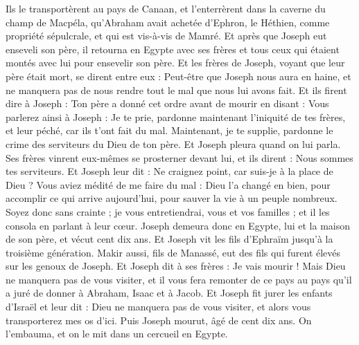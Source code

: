 \begin{multicols}{2}
Ils le transportèrent au pays de Canaan, et l'enterrèrent dans la caverne du champ de Macpéla, qu'Abraham avait achetée d'Ephron, le Héthien, comme propriété sépulcrale, et qui est vis-à-vis de Mamré.
Et après que Joseph eut enseveli son père, il retourna en Egypte avec ses frères et tous ceux qui étaient montés avec lui pour ensevelir son père.
Et les frères de Joseph, voyant que leur père était mort, se dirent entre eux : Peut-être que Joseph nous aura en haine, et ne manquera pas de nous rendre tout le mal que nous lui avons fait.
Et ils firent dire à Joseph : Ton père a donné cet ordre avant de mourir en disant :
Vous parlerez ainsi à Joseph : Je te prie, pardonne maintenant l'iniquité de tes frères, et leur péché, car ils t'ont fait du mal. Maintenant, je te supplie, pardonne le crime des serviteurs du Dieu de ton père. Et Joseph pleura quand on lui parla.
Ses frères vinrent eux-mêmes se prosterner devant lui, et ils dirent : Nous sommes tes serviteurs.
Et Joseph leur dit : Ne craignez point, car suis-je à la place de Dieu ?
Vous aviez médité de me faire du mal : Dieu l'a changé en bien, pour accomplir ce qui arrive aujourd'hui, pour sauver la vie à un peuple nombreux.
Soyez donc sans crainte ; je vous entretiendrai, vous et vos familles ; et il les consola en parlant à leur cœur.
Joseph demeura donc en Egypte, lui et la maison de son père, et vécut cent dix ans.
Et Joseph vit les fils d'Ephraïm jusqu'à la troisième génération. Makir aussi, fils de Manassé, eut des fils qui furent élevés sur les genoux de Joseph.
Et Joseph dit à ses frères : Je vais mourir ! Mais Dieu ne manquera pas de vous visiter, et il vous fera remonter de ce pays au pays qu'il a juré de donner à Abraham, Isaac et à Jacob.
Et Joseph fit jurer les enfants d'Israël et leur dit : Dieu ne manquera pas de vous visiter, et alors vous transporterez mes os d'ici.
Puis Joseph mourut, âgé de cent dix ans. On l'embauma, et on le mit dans un cercueil en Egypte.
\PPE{}
\end{multicols}
